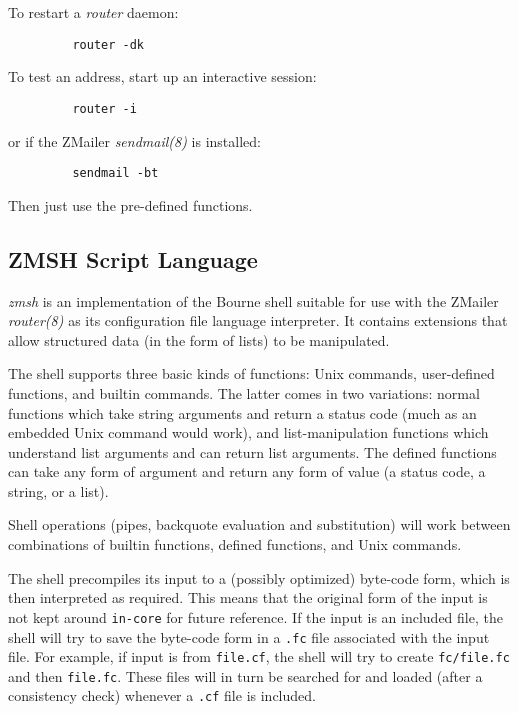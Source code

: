 To restart a {\em router\/} daemon: 
\begin{verbatim}
         router -dk
\end{verbatim}


To test an address, start up an interactive session: 
\begin{verbatim}
         router -i
\end{verbatim}


or if the ZMailer {\em sendmail(8)\/} is installed: 
\begin{verbatim}
         sendmail -bt
\end{verbatim}


Then just use the pre-defined functions.




\subsection{ZMSH Script Language}



{\em zmsh\/} is an implementation of the Bourne shell 
suitable for use with the ZMailer {\em router(8)\/} as 
its configuration file language interpreter. It contains 
extensions that allow structured data (in the form of lists) 
to be manipulated. 

The shell supports three basic kinds of functions: Unix 
commands, user-defined functions, and builtin commands. 
The latter comes in two variations: normal functions which 
take string arguments and return a status code (much as an 
embedded Unix command would work), and list-manipulation 
functions which understand list arguments and can return 
list arguments. The defined functions can take any form 
of argument and return any form of value (a status code, 
a string, or a list). 

Shell operations (pipes, backquote evaluation and substitution) 
will work between combinations of builtin functions, 
defined functions, and Unix commands.

The shell precompiles its input to a (possibly optimized) 
byte-code form, which is then interpreted as required. 
This means that the original form of the input is not kept 
around {\tt in-core} for future reference. If the input 
is an included file, the shell will try to save the byte-code 
form in a {\tt .fc} file associated with the input file. 
For example, if input is from {\tt file.cf}, the shell 
will try to create {\tt fc/file.fc} and then {\tt file.fc}. 
These files will in turn be searched for and loaded 
(after a consistency check) whenever a {\tt .cf} file is included. 

